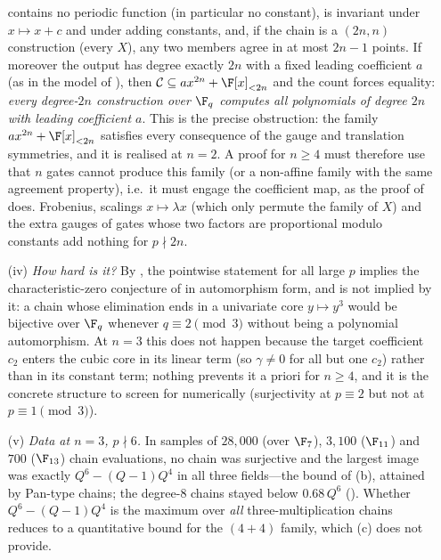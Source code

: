 \begin{remark}
\begin{enumerate}
   contains no periodic function (in particular no constant), is invariant under
   $x\mapsto x+c$ and under adding constants, and, if the chain is a $(2n,n)$
   construction (every $X$), any two members agree in at most $2n-1$ points.  If moreover
   the output has degree exactly $2n$ with a fixed leading coefficient $a$ (as in the
   model of ), then $\mathcal C\subseteq ax^{2n}+\F[x]_{<2n}$ and the
   count forces equality: \emph{every degree-$2n$ construction over $\F_q$ computes all
   polynomials of degree $2n$ with leading coefficient $a$}.  This is the precise
   obstruction: the family $ax^{2n}+\F[x]_{<2n}$ satisfies every consequence of the gauge
   and translation symmetries, and it is realised at $n=2$.  A proof for $n\ge4$ must
   therefore use that $n$ gates cannot produce this family (or a non-affine family with
   the same agreement property), i.e.\ it must engage the coefficient map, as the proof
   of  does.  Frobenius, scalings $x\mapsto\lambda x$ (which only
   permute the family of $X$) and the extra gauges of gates whose two factors are
   proportional modulo constants add nothing for $p\nmid 2n$.
\item[(iv)] \emph{How hard is it?}  By , the pointwise statement for
   all large $p$ implies the characteristic-zero conjecture of  in
   automorphism form, and is not implied by it: a chain whose elimination ends in a
   univariate core $y\mapsto y^3$ would be bijective over $\F_q$ whenever
   $q\equiv2\pmod3$ without being a polynomial automorphism.  At $n=3$ this does not
   happen because the target coefficient $c_2$ enters the cubic core in its linear term
   (so $\gamma\neq0$ for all but one $c_2$) rather than in its constant term; nothing
   prevents it a priori for $n\ge4$, and it is the concrete structure to screen for
   numerically (surjectivity at $p\equiv2$ but not at $p\equiv1\pmod3$).
\item[(v)] \emph{Data at $n=3$, $p\nmid6$.}  In samples of $28{,}000$ (over $\F_7$),
   $3{,}100$ ($\F_{11}$) and $700$ ($\F_{13}$) chain evaluations, no chain was surjective
   and the largest image was exactly $Q^6-(Q-1)Q^4$ in all three fields---the bound of
   (b), attained by Pan-type chains; the degree-$8$ chains stayed
   below $0.68\,Q^6$ ().  Whether $Q^6-(Q-1)Q^4$ is the
   maximum over \emph{all} three-multiplication chains reduces to a quantitative bound
   for the $(4{+}4)$ family, which (c) does not provide.
\end{enumerate}
\end{remark}

